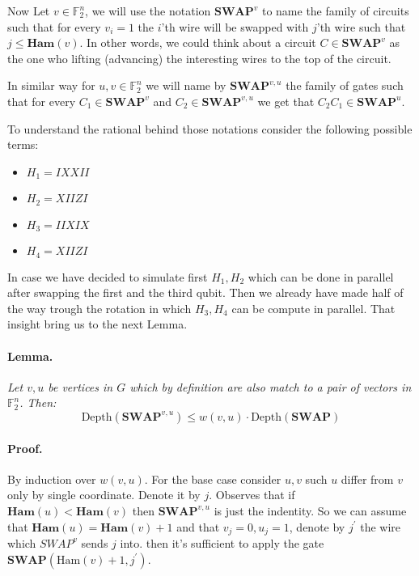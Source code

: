 \documentclass{article}
\begin{document}
\begin{multicols*}{2}
Now Let \(v \in \mathbb{F}_{2}^{n}\), we will use the notation \( \textbf{SWAP}^{v} \) to name the family of circuits such that for every \(v_i =1\) the \(i\)'th wire will be swapped with \(j\)'th wire such that \(j \le \textbf{Ham}(v)\). In other words, we could think about a circuit \(C \in \textbf{SWAP}^{v}\) as the one who lifting (advancing) the interesting wires to the top of the circuit.  

In similar way for \(u,v \in \mathbb{F}_{2}^{n}\) we will name by \( \textbf{SWAP}^{v,u} \) the family of gates such that for every \( C_{1} \in \textbf{SWAP}^{v}\) and \( C_{2} \in \textbf{SWAP}^{v,u} \) we get that \(C_{2}C_{1} \in \textbf{SWAP}^{u}\).

To understand the rational behind those notations consider the following  possible terms:
\begin{itemize}
    \item \(H_{1} = I  X  X  I  I \)
    \item \(H_{2} = X  I  I  Z  I \)
    \item \(H_{3} = I  I  X  I  X \)
    \item \(H_{4} = X  I  I  Z  I \)
\end{itemize} In case we have decided to simulate first \(H_{1},H_{2}\) which can be done in parallel after swapping the first and the third qubit. Then we already have made half of the way trough the rotation in which \(H_{3},H_{4}\) can be compute in parallel. That insight bring us to the next Lemma.     

\paragraph{Lemma.} \textit{ Let \(v,u\) be vertices in \(G\) which by definition are also match to a pair of vectors in \(\mathbb{F}_2^{n} \). Then:} 
\begin{equation*}
 \text{Depth}\left(\textbf{SWAP}^{v,u}\right) \le w(v,u)\cdot \text{Depth}\left(\textbf{SWAP}\right)
\end{equation*}

\paragraph{Proof.} By induction over \(w(v,u)\). For the base case consider \(u,v\) such \(u\) differ from \(v\) only by single coordinate. Denote it by \(j\). Observes that if $\textbf{Ham}(u) <\textbf{Ham}(v)$ then $\textbf{SWAP}^{v,u}$ is just the indentity. So we can assume that $ \textbf{Ham}(u) = \textbf{Ham}(v)+1 $ and that  \(v_j = 0, u_j =1\), denote by \(j^{\prime}\) the wire which \(SWAP^{v}\) sends \(j\) into. then it's sufficient to apply the gate \(\textbf{SWAP}(\text{Ham}(v) +1, j^\prime) \).



\end{multicols*}
\end{document}
